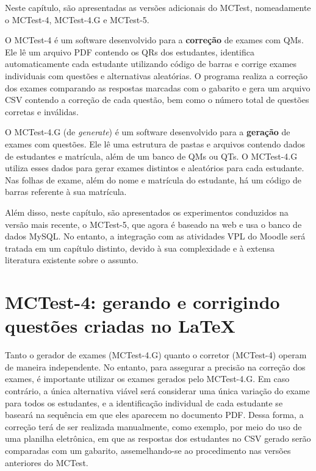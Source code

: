 \label{ch:experimentos_QR_QT}

Neste capítulo, são apresentadas as versões adicionais do MCTest, nomeadamente o MCTest-4, MCTest-4.G e MCTest-5.

O MCTest-4 é um software desenvolvido para a \textbf{correção} de exames com QMs. Ele lê um arquivo PDF contendo os QRs dos estudantes, identifica automaticamente cada estudante utilizando código de barras e corrige exames individuais com questões e alternativas aleatórias.  O programa realiza a correção dos exames comparando as respostas marcadas com o gabarito e gera um arquivo CSV contendo a correção de cada questão, bem como o número total de questões corretas e inválidas.

O MCTest-4.G (de \textit{generate}) é um software desenvolvido para a \textbf{geração} de exames com questões. Ele lê uma estrutura de pastas e arquivos contendo dados de estudantes e matrícula, além de um banco de QMs ou QTs. O MCTest-4.G utiliza esses dados para gerar exames distintos e aleatórios para cada estudante. Nas folhas de exame, além do nome e matrícula do estudante, há um código de barras referente à sua matrícula.

Além disso, neste capítulo, são apresentados os experimentos conduzidos na versão mais recente, o MCTest-5, que agora é baseado na web e usa o banco de dados MySQL. No entanto, a integração com as atividades VPL do Moodle será tratada em um capítulo distinto, devido à sua complexidade e à extensa literatura existente sobre o assunto.


\section{MCTest-4: gerando e corrigindo questões criadas no \LaTeX}

Tanto o gerador de exames (MCTest-4.G) quanto o corretor (MCTest-4) operam de maneira independente. No entanto, para assegurar a precisão na correção dos exames, é importante utilizar os exames gerados pelo MCTest-4.G. Em caso contrário, a única alternativa viável será considerar uma única variação do exame para todos os estudantes, e a identificação individual de cada estudante se baseará na sequência em que eles aparecem no documento PDF. Dessa forma, a correção terá de ser realizada manualmente, como exemplo, por meio do uso de uma planilha eletrônica, em que as respostas dos estudantes no CSV gerado serão comparadas com um gabarito, assemelhando-se ao procedimento nas versões anteriores do MCTest.

